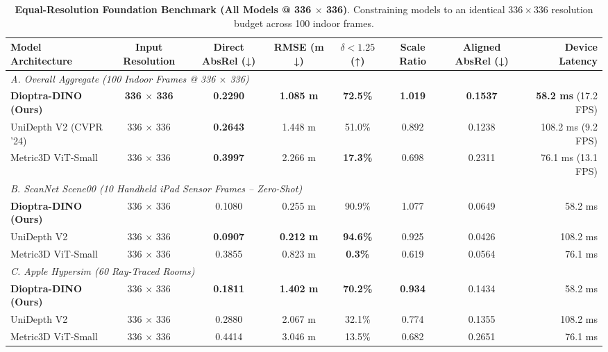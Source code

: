 \documentclass[10pt,twocolumn,letterpaper]{article}
\begin{document}
\begin{table}[t]
\centering
\caption{\textbf{Equal-Resolution Foundation Benchmark (All Models @ 336 $\times$ 336)}. Constraining models to an identical $336 \times 336$ resolution budget across 100 indoor frames.}
\label{tab:equal_336}
\small
\begin{tabular}{lccccccr}
\toprule
\textbf{Model Architecture} & \textbf{Input Resolution} & \textbf{Direct AbsRel (↓)} & \textbf{RMSE (m ↓)} & \textbf{$\delta < 1.25$ (↑)} & \textbf{Scale Ratio} & \textbf{Aligned AbsRel (↓)} & \textbf{Device Latency} \\
\midrule
\multicolumn{8}{l}{\textit{A. Overall Aggregate (100 Indoor Frames @ 336 $\times$ 336)}} \\
\textbf{Dioptra-DINO (Ours)} & \textbf{336 $\times$ 336} & \textbf{0.2290} & \textbf{1.085 m} & \textbf{72.5\%} & \textbf{1.019} & \textbf{0.1537} & \textbf{58.2 ms} (17.2 FPS) \\
UniDepth V2 (CVPR '24) \cite{piccinelli2024unidepth} & 336 $\times$ 336 & \textbf{0.2643} & 1.448 m & 51.0\% & 0.892 & 0.1238 & 108.2 ms (9.2 FPS) \\
Metric3D ViT-Small \cite{yin2023metric3d} & 336 $\times$ 336 & \textbf{0.3997} & 2.266 m & \textbf{17.3\%} & 0.698 & 0.2311 & 76.1 ms (13.1 FPS) \\
\midrule
\multicolumn{8}{l}{\textit{B. ScanNet Scene00 (10 Handheld iPad Sensor Frames -- Zero-Shot)}} \\
\textbf{Dioptra-DINO (Ours)} & 336 $\times$ 336 & 0.1080 & 0.255 m & 90.9\% & 1.077 & 0.0649 & 58.2 ms \\
UniDepth V2 \cite{piccinelli2024unidepth} & 336 $\times$ 336 & \textbf{0.0907} & \textbf{0.212 m} & \textbf{94.6\%} & 0.925 & 0.0426 & 108.2 ms \\
Metric3D ViT-Small \cite{yin2023metric3d} & 336 $\times$ 336 & 0.3855 & 0.823 m & \textbf{0.3\%} & 0.619 & 0.0564 & 76.1 ms \\
\midrule
\multicolumn{8}{l}{\textit{C. Apple Hypersim (60 Ray-Traced Rooms)}} \\
\textbf{Dioptra-DINO (Ours)} & 336 $\times$ 336 & \textbf{0.1811} & \textbf{1.402 m} & \textbf{70.2\%} & \textbf{0.934} & 0.1434 & 58.2 ms \\
UniDepth V2 \cite{piccinelli2024unidepth} & 336 $\times$ 336 & 0.2880 & 2.067 m & 32.1\% & 0.774 & 0.1355 & 108.2 ms \\
Metric3D ViT-Small \cite{yin2023metric3d} & 336 $\times$ 336 & 0.4414 & 3.046 m & 13.5\% & 0.682 & 0.2651 & 76.1 ms \\
\bottomrule
\end{tabular}
\end{table}
\end{document}

